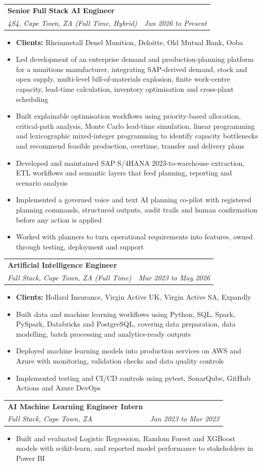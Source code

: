 \documentclass[letterpaper,11pt]{article}
\makeatletter
\newcommand{\resumeItem}[1]{
  \item\small{
    {#1 \vspace{-1pt}}
  }
}
\newcommand{\resumeSubheading}[4]{
  \vspace{-2pt}\item
    \begin{tabular*}{1.0\textwidth}[t]{l@{\extracolsep{\fill}}r}
      \textbf{\large#1} & \textbf{\small #2} \\
      \textit{\large#3} & \textit{\small #4} \\

    \end{tabular*}\vspace{-7pt}
}
\newcommand{\resumeItemListStart}{\begin{itemize}[leftmargin=0.1in]}
\newcommand{\resumeItemListEnd}{\end{itemize}\vspace{-5pt}}
\makeatother
\begin{document}
    \resumeSubheading
      {Senior Full Stack AI Engineer}{}
      {4S4, Cape Town, ZA (Full Time, Hybrid)}{Jun 2026 to Present}
      \resumeItemListStart
            \resumeItem{\small{\textbf{Clients:} Rheinmetall Denel Munition, Deloitte, Old Mutual Bank, Ooba}}
            \resumeItem{\small{Led development of an enterprise demand and production-planning platform for a munitions manufacturer, integrating SAP-derived demand, stock and open supply, multi-level bill-of-materials explosion, finite work-centre capacity, lead-time calculation, inventory optimisation and cross-plant scheduling}}
            \resumeItem{\small{Built explainable optimisation workflows using priority-based allocation, critical-path analysis, Monte Carlo lead-time simulation, linear programming and lexicographic mixed-integer programming to identify capacity bottlenecks and recommend feasible production, overtime, transfer and delivery plans}}
            \resumeItem{\small{Developed and maintained SAP S/4HANA 2023-to-warehouse extraction, ETL workflows and semantic layers that feed planning, reporting and scenario analysis}}
            \resumeItem{\small{Implemented a governed voice and text AI planning co-pilot with registered planning commands, structured outputs, audit trails and human confirmation before any action is applied}}
            \resumeItem{\small{Worked with planners to turn operational requirements into features, owned through testing, deployment and support}}
      \resumeItemListEnd
      \vspace{2pt}

    \resumeSubheading
      {Artificial Intelligence Engineer}{}
      {Full Stack, Cape Town, ZA (Full Time)}{Mar 2023 to May 2026}
      \resumeItemListStart
            \resumeItem{\small{\textbf{Clients:} Hollard Insurance, Virgin Active UK, Virgin Active SA, Expandly}}
            \resumeItem{\small{Built data and machine learning workflows using Python, SQL, Spark, PySpark, Databricks and PostgreSQL, covering data preparation, data modelling, batch processing and analytics-ready outputs}}
            \resumeItem{\small{Deployed machine learning models into production services on AWS and Azure with monitoring, validation checks and data quality controls}}
            \resumeItem{\small{Implemented testing and CI/CD controls using pytest, SonarQube, GitHub Actions and Azure DevOps}}
      \resumeItemListEnd
      \vspace{2pt}

    \resumeSubheading
      {AI Machine Learning Engineer Intern}{}
      {Full Stack, Cape Town, ZA}{Jan 2023 to Mar 2023}
      \resumeItemListStart
            \resumeItem{\small{Built and evaluated Logistic Regression, Random Forest and XGBoost models with scikit-learn, and reported model performance to stakeholders in Power BI}}
      \resumeItemListEnd
      \vspace{2pt}
\end{document}
